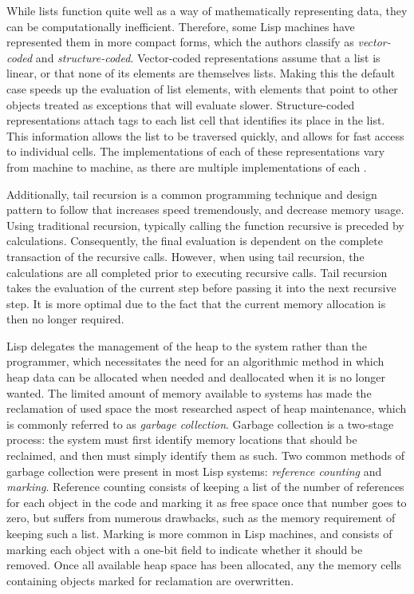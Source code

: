\documentclass[journal]{IEEEtran}
\begin{document}
While lists function quite well as a way of mathematically representing data, they can be computationally inefficient. Therefore, some Lisp machines have represented them in more compact forms, which the authors classify as \textit{vector-coded} and \textit{structure-coded}. Vector-coded representations assume that a list is linear, or that none of its elements are themselves lists. Making this the default case speeds up the evaluation of list elements, with elements that point to other objects treated as exceptions that will evaluate slower. Structure-coded representations attach tags to each list cell that identifies its place in the list. This information allows the list to be traversed quickly, and allows for fast access to individual cells. The implementations of each of these representations vary from machine to machine, as there are multiple implementations of each \cite{pt}.

Additionally, tail recursion is a common programming technique and design pattern to follow that increases speed tremendously, and decrease memory usage. Using traditional recursion, typically calling the function recursive is preceded by calculations. Consequently, the final evaluation is dependent on the complete transaction of the recursive calls. However, when using tail recursion, the calculations are all completed prior to executing recursive calls. Tail recursion takes the evaluation of the current step before passing it into the next recursive step. It is more optimal due to the fact that the current memory allocation is then no longer required.

Lisp delegates the management of the heap to the system rather than the programmer, which necessitates the need for an algorithmic method in which heap data can be allocated when needed and deallocated when it is no longer wanted. The limited amount of memory available to systems has made the reclamation of used space the most researched aspect of heap maintenance, which is commonly referred to as \textit{garbage collection}. Garbage collection is a two-stage process: the system must first identify memory locations that should be reclaimed, and then must simply identify them as such. Two common methods of garbage collection were present in most Lisp systems: \textit{reference counting} and \textit{marking}. Reference counting consists of keeping a list of the number of references for each object in the code and marking it as free space once that number goes to zero, but suffers from numerous drawbacks, such as the memory requirement of keeping such a list. Marking is more common in Lisp machines, and consists of marking each object with a one-bit field to indicate whether it should be removed. Once all available heap space has been allocated, any the memory cells containing objects marked for reclamation are overwritten.
\end{document}
